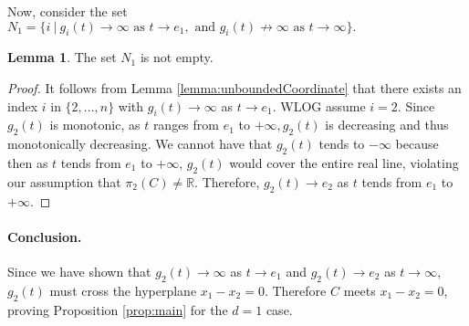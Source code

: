 \documentclass[10pt]{article}
\theoremstyle{definition}
\newtheorem{lemma}{Lemma}
\newcommand{\R}{\mathbb{R}}
\def\ms#1{\textcolor{olive}{#1}}
\begin{document}
%
\noindent
Now, consider the set $N_1 = \big\{i~|~g_i(t) \rightarrow \infty \textrm{ as } t \rightarrow e_1, \textrm{ and } g_i(t) \not \rightarrow \infty \textrm{ as } t \rightarrow \infty\big\}.$
%
\begin{lemma}
    The set $N_1$ is not empty. 
\end{lemma}
%
\begin{proof}
It follows from Lemma \ref{lemma:unboundedCoordinate} that there exists an index $i$ in $\{2,\hdots,n\}$ with $g_i(t) \rightarrow \infty$ as $t
\rightarrow e_1$.
WLOG assume $i=2.$ Since
$g_2(t)$ is monotonic, as $t$ ranges from $e_1$ to $+\infty, g_2(t)$ is decreasing and thus monotonically decreasing. We cannot have that $g_2(t)$ tends to $-\infty$ because then as $t$ tends from $e_1$ to $+\infty$, $g_2(t)$ would cover the entire real line, violating our assumption that $\pi_2(C) \not = \R$. Therefore, $g_2(t) \rightarrow e_2$ as $t$ tends from $e_1$ to $+\infty$.
\end{proof}
%







\paragraph*{Conclusion.}
Since we have shown that $g_2(t) \rightarrow \infty$ as $t \rightarrow e_1$ and $g_2(t) \rightarrow e_2$ as $t \rightarrow \infty$, $g_2(t)$ must cross the hyperplane $x_1-x_2=0$.  Therefore $C$ meets $x_1-x_2=0$, proving Proposition \ref{prop:main} for the $d=1$ case.  





\end{document}
